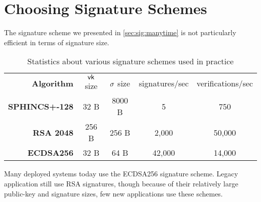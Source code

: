 \fi

\section{Choosing Signature Schemes}
The signature scheme we presented in \cref{sec:sig:manytime}
is not particularly efficient in terms of signature size.

\begin{table}[htpb]
	\centering
	\caption{Statistics about various signature schemes used in practice}
	\label{tab:sig_schemes}

	\begin{tabular}{rcccc}
		\textbf{Algorithm} & $\mathsf{vk}$ size & $\sigma$ size & signatures/sec & verifications/sec \\
		\bf{SPHINCS+-128} & 32 B & 8000 B & 5 & 750 \\
		\bf{RSA 2048} & 256 B & 256 B & 2,000 & 50,000 \\
		\bf{ECDSA256} & 32 B & 64 B & 42,000 & 14,000 \\
	\end{tabular}
\end{table}

Many deployed systems today use the ECDSA256 signature scheme.
Legacy application still use RSA signatures, though because of their
relatively large public-key and signature sizes, few new applications
use these schemes.

